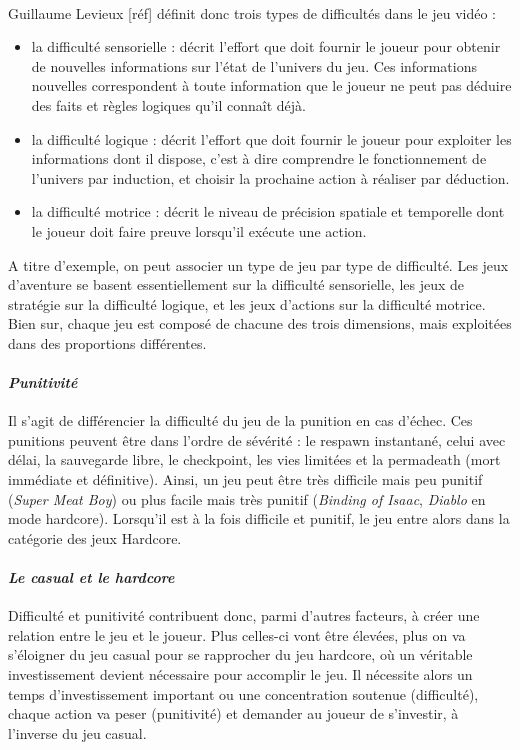 \paragraph{}Guillaume Levieux [réf] définit donc trois types de difficultés dans le jeu vidéo :
	\begin{itemize}
		\item la difficulté sensorielle : décrit l’effort que doit fournir le joueur pour obtenir de nouvelles informations sur l’état de l’univers du jeu. Ces informations nouvelles correspondent à toute information que le joueur ne peut pas déduire des faits et règles logiques qu’il connaît déjà.
		\item la difficulté logique : décrit l’effort que doit fournir le joueur pour exploiter les informations dont il dispose, c’est à dire comprendre le fonctionnement de l’univers par induction, et choisir la prochaine action à réaliser par déduction.
		\item la difficulté motrice : décrit le niveau de précision spatiale et temporelle dont le joueur doit faire preuve lorsqu’il exécute une action.
\end{itemize}
A titre d’exemple, on peut associer un type de jeu par type de difficulté. Les jeux d’aventure se basent essentiellement sur la difficulté sensorielle, les jeux de stratégie sur la difficulté logique, et les jeux d’actions sur la difficulté motrice. Bien sur, chaque jeu est composé de chacune des trois dimensions, mais exploitées dans des proportions différentes.
		
		\paragraph{\emph{Punitivité}\\ \quad}
Il s’agit de différencier la difficulté du jeu de la punition en cas d’échec. Ces punitions peuvent être dans l’ordre de sévérité : le respawn instantané, celui avec délai, la sauvegarde libre, le checkpoint, les vies limitées et la permadeath (mort immédiate et définitive). Ainsi, un jeu peut être très difficile mais peu punitif (\emph{Super Meat Boy}) ou plus facile mais très punitif (\emph{Binding of Isaac}, \emph{Diablo} en mode hardcore). Lorsqu’il est à la fois difficile et punitif, le jeu entre alors dans la catégorie des jeux Hardcore.

		\paragraph{\emph{Le casual et le hardcore}\\ \quad}
Difficulté et punitivité contribuent donc, parmi d’autres facteurs, à créer une relation entre le jeu et le joueur. Plus celles-ci vont être élevées, plus on va s’éloigner du jeu casual pour se rapprocher du jeu hardcore, où un véritable investissement devient nécessaire pour accomplir le jeu. Il nécessite alors un temps d’investissement important ou une concentration soutenue (difficulté), chaque action va peser (punitivité) et demander au joueur de s’investir, à l’inverse du jeu casual.		
		
